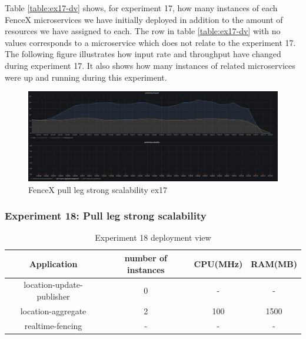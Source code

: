 \documentclass[a4]{report}
\begin{document}
    Table \ref{table:ex17-dv} shows, for experiment 17, how many instances of each FenceX microservices we have
    initially deployed in addition to the amount of resources we have assigned to each.
    The row in table \ref{table:ex17-dv} with no values corresponds to a microservice which does not relate to the
    experiment 17.
    The following figure illustrates how input rate and throughput have changed during experiment 17.
    It also shows how many instances of related microservices were up and running during this experiment.

    \begin{figure}
        \caption{FenceX pull leg strong scalability ex17}
        \label{fig:ex17}
        \includegraphics[scale=0.5]{images/evaluation/ex17-benchmarking-ongoing-2per4sec.png}
    \end{figure}

    \clearpage

    \subsubsection{Experiment 18: Pull leg strong scalability}
    \begin{table}[h!]
        \centering
        \begin{tabular}{|c|c|c|c|}
            \hline
            Application               & number of instances & CPU(MHz) & RAM(MB) \\
            \hline
            location-update-publisher & 0                   & -        & -       \\
            location-aggregate        & 2                   & 100      & 1500    \\
            realtime-fencing          & -                   & -        & -       \\
            \hline
        \end{tabular}
        \caption{Experiment 18 deployment view}
        \label{table:ex18-dv}
    \end{table}
\end{document}
